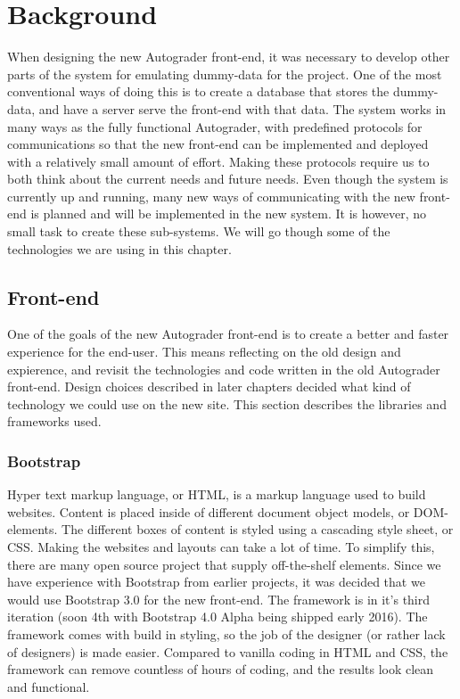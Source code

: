 \chapter{Background}
When designing the new Autograder front-end, it was necessary to develop other parts of the system for emulating dummy-data for the project. One of the most conventional ways of doing this is to create a database that stores the dummy-data, and have a server serve the front-end with that data. The system works in many ways as the fully functional Autograder, with predefined protocols for communications so that the new front-end can be implemented and deployed with a relatively small amount of effort. Making these protocols require us to both think about the current needs and future needs. Even though the system is currently up and running, many new ways of communicating with the new front-end is planned and will be implemented in the new system. It is however, no small task to create these sub-systems. We will go though some of the technologies we are using in this chapter.

\section{Front-end}
One of the goals of the new Autograder front-end is to create a better and faster experience for the end-user. This means reflecting on the old design and expierence, and revisit the technologies and code written in the old Autograder front-end. Design choices described in later chapters decided what kind of technology we could use on the new site. This section describes the libraries and frameworks used.

\subsection{Bootstrap}
Hyper text markup language, or HTML, is a markup language used to build websites. Content is placed inside of different document object models, or DOM-elements. The different boxes of content is styled using a cascading style sheet, or CSS. Making the websites and layouts can take a lot of time. To simplify this, there are many open source project that supply off-the-shelf elements. Since we have experience with Bootstrap from earlier projects, it was decided that we would use Bootstrap 3.0 for the new front-end. The framework is in it's third iteration (soon 4th with Bootstrap 4.0 Alpha being shipped early 2016). The framework comes with build in styling, so the job of the designer (or rather lack of designers) is made easier. Compared to vanilla coding in HTML and CSS, the framework can remove countless of hours of coding, and the results look clean and functional.


